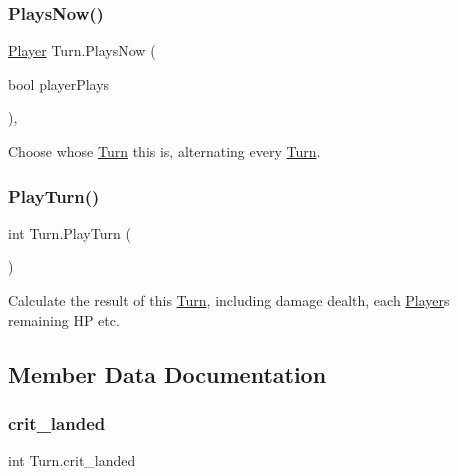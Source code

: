 \subsubsection{\texorpdfstring{PlaysNow()}{PlaysNow()}}
{\footnotesize\ttfamily \mbox{\hyperlink{class_player}{Player}} Turn.\+Plays\+Now (\begin{DoxyParamCaption}\item[{bool}]{player\+Plays }\end{DoxyParamCaption})\hspace{0.3cm}{\ttfamily [inline]}, {\ttfamily [private]}}



Choose whose \mbox{\hyperlink{class_turn}{Turn}} this is, alternating every \mbox{\hyperlink{class_turn}{Turn}}. 

\mbox{\label{class_turn_abc3ccf0218afc2904a2dbd37561a56b2}} 
\subsubsection{\texorpdfstring{PlayTurn()}{PlayTurn()}}
{\footnotesize\ttfamily int Turn.\+Play\+Turn (\begin{DoxyParamCaption}{ }\end{DoxyParamCaption})\hspace{0.3cm}{\ttfamily [inline]}}



Calculate the result of this \mbox{\hyperlink{class_turn}{Turn}}, including damage dealth, each \mbox{\hyperlink{class_player}{Player}}\textquotesingle{}s remaining HP etc. 



\subsection{Member Data Documentation}
\mbox{\label{class_turn_adee435c5c71d7bfe0c701e11dea8c365}} 
\subsubsection{\texorpdfstring{crit\_landed}{crit\_landed}}
{\footnotesize\ttfamily int Turn.\+crit\+\_\+landed}

\mbox{\label{class_turn_a1bd13f96a59a1f958d2e8c98657d860d}} 
